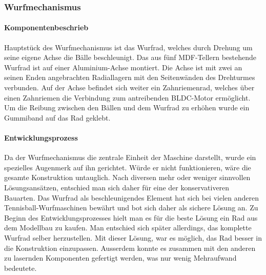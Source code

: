\subsubsection{Wurfmechanismus}

\paragraph{Komponentenbeschrieb}

Hauptstück des Wurfmechanismus ist das Wurfrad, welches durch Drehung um seine eigene Achse die Bälle beschleunigt.
Das aus fünf MDF-Tellern bestehende Wurfrad ist auf einer  Aluminium-Achse montiert. Die Achse ist mit zwei an seinen Enden angebrachten Radiallagern mit den Seitenwänden des Drehturmes verbunden. Auf der Achse befindet sich weiter ein Zahnriemenrad, welches über einen Zahnriemen die Verbindung zum antreibenden BLDC-Motor ermöglicht.
Um die Reibung zwischen den Bällen und dem Wurfrad zu erhöhen wurde ein Gummiband auf das Rad geklebt.

\paragraph{Entwicklungsprozess}

Da der Wurfmechanismus die zentrale Einheit der Maschine darstellt, wurde ein spezielles Augenmerk auf ihn gerichtet. Würde er nicht funktionieren, wäre die gesamte Konstruktion untauglich. Nach diversen mehr oder weniger sinnvollen Lösungsansätzen, entschied man sich daher für eine der konservativeren Bauarten.
Das Wurfrad als beschleunigendes Element hat sich bei vielen anderen Tennisball-Wurfmaschinen bewährt und bot sich daher als sichere Lösung an.
Zu Beginn des Entwicklungsprozesses hielt man es für die beste Lösung ein Rad aus dem Modellbau zu kaufen. Man entschied sich später allerdings, das komplette Wurfrad selber herzustellen. Mit dieser Lösung, war es möglich, das Rad besser in die Konstruktion einzupassen. Ausserdem konnte es zusammen mit den anderen zu lasernden Komponenten gefertigt werden, was nur wenig Mehraufwand bedeutete.